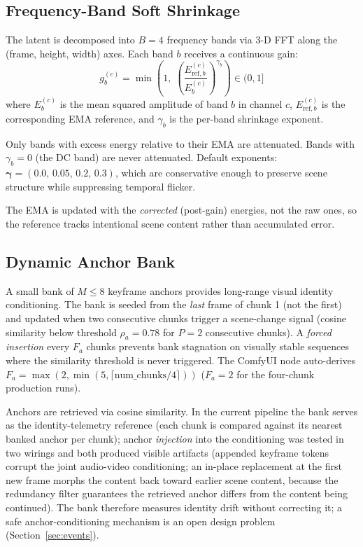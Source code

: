 \documentclass[12pt]{article}
\begin{document}
\subsection{Frequency-Band Soft Shrinkage}
\label{sec:shrink}

The latent is decomposed into $B=4$ frequency bands via 3-D FFT along
the (frame, height, width) axes.  Each band $b$ receives a continuous gain:
\begin{equation}
g_b^{(c)} = \min\!\left(1,\; \left(\frac{E_{\text{ref},b}^{(c)}}{E_{b}^{(c)}}\right)^{\!\gamma_b}\right) \in (0,1]
\label{eq:gain}
\end{equation}
where $E_b^{(c)}$ is the mean squared amplitude of band $b$ in channel $c$,
$E_{\text{ref},b}^{(c)}$ is the corresponding EMA reference, and
$\gamma_b$ is the per-band shrinkage exponent.

Only bands with excess energy relative to their EMA are attenuated.  Bands with
$\gamma_b = 0$ (the DC band) are never attenuated.  Default exponents:
$\boldsymbol\gamma = (0.0,\,0.05,\,0.2,\,0.3)$, which are conservative enough
to preserve scene structure while suppressing temporal flicker.

The EMA is updated with the \emph{corrected} (post-gain) energies, not the raw
ones, so the reference tracks intentional scene content rather than accumulated
error.

\subsection{Dynamic Anchor Bank}
\label{sec:anchor}

A small bank of $M \le 8$ keyframe anchors provides long-range visual identity
conditioning.  The bank is seeded from the \emph{last} frame of chunk 1 (not
the first) and updated when two consecutive chunks trigger a scene-change
signal (cosine similarity below threshold $\rho_a=0.78$ for $P=2$ consecutive
chunks).  A \emph{forced insertion} every $F_a$ chunks prevents bank
stagnation on visually stable sequences where the similarity threshold is
never triggered.  The ComfyUI node auto-derives
$F_a = \max(2, \min(5, \lceil\text{num\_chunks}/4\rceil))$ ($F_a=2$ for the
four-chunk production runs).

Anchors are retrieved via cosine similarity.  In the current pipeline the bank
serves as the identity-telemetry reference (each chunk is compared against its
nearest banked anchor per chunk); anchor \emph{injection} into the
conditioning was tested in two wirings and both produced visible artifacts
(appended keyframe tokens corrupt the joint audio-video conditioning; an
in-place replacement at the first new frame morphs the content back toward
earlier scene content, because the redundancy filter guarantees the retrieved
anchor differs from the content being continued).  The bank therefore measures
identity drift without correcting it; a safe anchor-conditioning mechanism is
an open design problem (Section~\ref{sec:events}).
\end{document}
